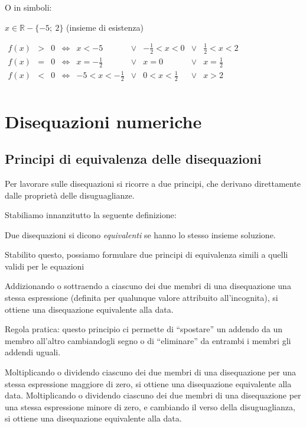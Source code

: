 O in simboli:

$x \in \mathbb{R} - \{ -5;~2 \}$ (insieme di esistenza)

$\begin{array}{cccccccccc}
f(x) & > & 0 & \Leftrightarrow &
 x < -5 & \lor & -\frac{1}{2} < x < 0 & \lor & \frac{1}{2} < x < 2 \\
 
f(x) & = & 0 & \Leftrightarrow &
 x = -\frac{1}{2} & \lor & x = 0 & \lor & x = \frac{1}{2} \\
 
f(x) & < & 0 & \Leftrightarrow &
 -5 < x < -\frac{1}{2} & \lor & 0 < x < \frac{1}{2} & \lor & x > 2 \\
\end{array}$

\section{Disequazioni numeriche}
\label{sec:dis_numeriche}

\subsection{Principi di equivalenza delle disequazioni}

Per lavorare sulle disequazioni si ricorre a due principi, che derivano 
direttamente dalle proprietà delle disuguaglianze.

Stabiliamo innanzitutto la seguente definizione:

\begin{definizione}
Due disequazioni si dicono \emph{equivalenti} se hanno lo
stesso insieme soluzione.
\end{definizione}

Stabilito questo, possiamo formulare due principi di equivalenza
simili a quelli validi per le equazioni

\begin{principio}[I principio]
\label{ppd}
Addizionando o sottraendo a ciascuno dei due membri di
una disequazione una stessa espressione (definita per qualunque
valore attribuito all'incognita), si ottiene una
disequazione equivalente alla data.
\end{principio}

Regola pratica: questo principio ci permette di
``spostare'' un addendo da un membro
all'altro cambiandogli segno o di
``eliminare'' da entrambi i membri
gli addendi uguali.

\begin{principio}[II principio]
Moltiplicando o dividendo ciascuno dei due membri di
una disequazione per una stessa espressione maggiore di zero, 
si ottiene una disequazione equivalente alla data.
Moltiplicando o dividendo ciascuno dei due membri di
una disequazione per una stessa espressione minore di zero, 
e cambiando il verso della disuguaglianza,
si ottiene una disequazione equivalente alla data.
\end{principio}

